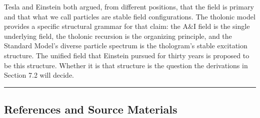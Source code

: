 \documentclass[
  11pt,
  letterpaper,
]{article}
\begin{document}
Tesla and Einstein both argued, from different positions, that the field
is primary and that what we call particles are stable field
configurations. The tholonic model provides a specific structural
grammar for that claim: the A\(\&\)I field is the single underlying
field, the tholonic recursion is the organizing principle, and the
Standard Model's diverse particle spectrum is the thologram's stable
excitation structure. The unified field that Einstein pursued for thirty
years is proposed to be this structure. Whether it is that structure is
the question the derivations in Section 7.2 will decide.

\begin{center}\rule{0.5\linewidth}{0.5pt}\end{center}

\subsection{References and Source
Materials}\label{references-and-source-materials}
\end{document}
